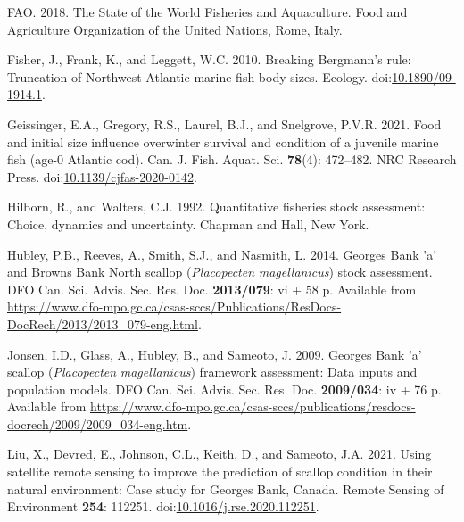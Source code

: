 \documentclass[
]{article}
\newlength{\cslhangindent}
\newlength{\cslentryspacingunit} %
\newenvironment{CSLReferences}[2] %
 {%
  \setlength{\parindent}{0pt}
  \ifodd #1
  \let\oldpar\par
  \def\par{\hangindent=\cslhangindent\oldpar}
  \fi
  \setlength{\parskip}{#2\cslentryspacingunit}
 }%
 {}
\begin{document}
\begin{CSLReferences}{1}{0}
\leavevmode{}%
FAO. 2018. The {State} of the {World Fisheries} and {Aquaculture}. {Food and Agriculture Organization of the United Nations}, {Rome, Italy}.

\leavevmode{}%
Fisher, J., Frank, K., and Leggett, W.C. 2010. Breaking {Bergmann}'s rule: Truncation of {Northwest Atlantic} marine fish body sizes. Ecology. doi:\href{https://doi.org/10.1890/09-1914.1}{10.1890/09-1914.1}.

\leavevmode{}%
Geissinger, E.A., Gregory, R.S., Laurel, B.J., and Snelgrove, P.V.R. 2021. Food and initial size influence overwinter survival and condition of a juvenile marine fish (age-0 {Atlantic} cod). Can. J. Fish. Aquat. Sci. \textbf{78}(4): 472--482. {NRC Research Press}. doi:\href{https://doi.org/10.1139/cjfas-2020-0142}{10.1139/cjfas-2020-0142}.

\leavevmode{}%
Hilborn, R., and Walters, C.J. 1992. Quantitative fisheries stock assessment: Choice, dynamics and uncertainty. {Chapman and Hall}, {New York}.

\leavevmode{}%
Hubley, P.B., Reeves, A., Smith, S.J., and Nasmith, L. 2014. Georges {Bank} 'a' and {Browns Bank North} scallop ({\emph{Placopecten}} {\emph{magellanicus}}) stock assessment. DFO Can. Sci. Advis. Sec. Res. Doc. \textbf{2013/079}: vi + 58 p. Available from \url{https://www.dfo-mpo.gc.ca/csas-sccs/Publications/ResDocs-DocRech/2013/2013_079-eng.html}.

\leavevmode{}%
Jonsen, I.D., Glass, A., Hubley, B., and Sameoto, J. 2009. Georges {Bank} 'a' scallop ({\emph{Placopecten}} {\emph{magellanicus}}) framework assessment: Data inputs and population models. DFO Can. Sci. Advis. Sec. Res. Doc. \textbf{2009/034}: iv + 76 p. Available from \url{https://www.dfo-mpo.gc.ca/csas-sccs/publications/resdocs-docrech/2009/2009_034-eng.htm}.

\leavevmode{}%
Liu, X., Devred, E., Johnson, C.L., Keith, D., and Sameoto, J.A. 2021. Using satellite remote sensing to improve the prediction of scallop condition in their natural environment: {Case} study for {Georges Bank}, {Canada}. Remote Sensing of Environment \textbf{254}: 112251. doi:\href{https://doi.org/10.1016/j.rse.2020.112251}{10.1016/j.rse.2020.112251}.


\end{CSLReferences}
\end{document}
